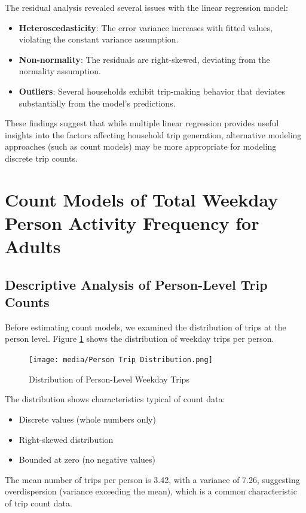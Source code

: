 \documentclass[12pt]{article}
\begin{document}
The residual analysis revealed several issues with the linear regression model:

\begin{itemize}
    \item \textbf{Heteroscedasticity}: The error variance increases with fitted values, violating the constant variance assumption.
    \item \textbf{Non-normality}: The residuals are right-skewed, deviating from the normality assumption.
    \item \textbf{Outliers}: Several households exhibit trip-making behavior that deviates substantially from the model's predictions.
\end{itemize}

These findings suggest that while multiple linear regression provides useful insights into the factors affecting household trip generation, alternative modeling approaches (such as count models) may be more appropriate for modeling discrete trip counts.

\section{Count Models of Total Weekday Person Activity Frequency for Adults}

\subsection{Descriptive Analysis of Person-Level Trip Counts}

Before estimating count models, we examined the distribution of trips at the person level. Figure \ref{fig:person_trips} shows the distribution of weekday trips per person.

\begin{figure}[H]
\centering
\texttt{[image: media/Person Trip Distribution.png]}
\caption{Distribution of Person-Level Weekday Trips}
\label{fig:person_trips}
\end{figure}

The distribution shows characteristics typical of count data:
\begin{itemize}
    \item Discrete values (whole numbers only)
    \item Right-skewed distribution
    \item Bounded at zero (no negative values)
\end{itemize}

The mean number of trips per person is 3.42, with a variance of 7.26, suggesting overdispersion (variance exceeding the mean), which is a common characteristic of trip count data.
\end{document}
